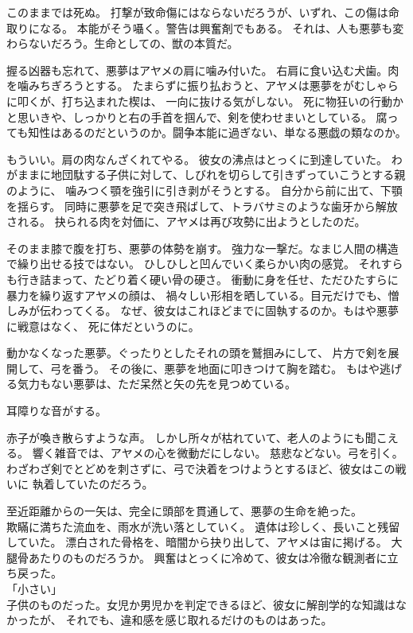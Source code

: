 \documentclass[../IHMain]{subfiles}
\begin{document}
このままでは死ぬ。
打撃が致命傷にはならないだろうが、いずれ、この傷は命取りになる。
本能がそう囁く。警告は興奮剤でもある。
それは、人も悪夢も変わらないだろう。生命としての、獣の本質だ。

握る凶器も忘れて、悪夢はアヤメの肩に噛み付いた。
右肩に食い込む犬歯。肉を噛みちぎろうとする。
たまらずに振り払おうと、アヤメは悪夢をがむしゃらに叩くが、打ち込まれた楔は、
一向に抜ける気がしない。
死に物狂いの行動かと思いきや、しっかりと右の手首を掴んで、剣を使わせまいとしている。
腐っても知性はあるのだというのか。闘争本能に過ぎない、単なる悪戯の類なのか。

もういい。肩の肉なんざくれてやる。
彼女の沸点はとっくに到達していた。
わがままに地団駄する子供に対して、しびれを切らして引きずっていこうとする親のように、
噛みつく顎を強引に引き剥がそうとする。
自分から前に出て、下顎を揺らす。
同時に悪夢を足で突き飛ばして、トラバサミのような歯牙から解放される。
抉られる肉を対価に、アヤメは再び攻勢に出ようとしたのだ。

そのまま膝で腹を打ち、悪夢の体勢を崩す。
強力な一撃だ。なまじ人間の構造で繰り出せる技ではない。
ひしひしと凹んでいく柔らかい肉の感覚。
それすらも行き詰まって、たどり着く硬い骨の硬さ。
衝動に身を任せ、ただひたすらに暴力を繰り返すアヤメの顔は、
禍々しい形相を晒している。目元だけでも、憎しみが伝わってくる。
なぜ、彼女はこれほどまでに固執するのか。もはや悪夢に戦意はなく、
死に体だというのに。

動かなくなった悪夢。ぐったりとしたそれの頭を鷲掴みにして、
片方で剣を展開して、弓を番う。
その後に、悪夢を地面に叩きつけて胸を踏む。
もはや逃げる気力もない悪夢は、ただ呆然と矢の先を見つめている。

耳障りな音がする。

赤子が喚き散らすような声。
しかし所々が枯れていて、老人のようにも聞こえる。
響く雑音では、アヤメの心を微動だにしない。
慈悲などない。弓を引く。
わざわざ剣でとどめを刺さずに、弓で決着をつけようとするほど、彼女はこの戦いに
執着していたのだろう。

至近距離からの一矢は、完全に頭部を貫通して、悪夢の生命を絶った。\\

欺瞞に満ちた流血を、雨水が洗い落としていく。
遺体は珍しく、長いこと残留していた。
漂白された骨格を、暗闇から抉り出して、アヤメは宙に掲げる。
大腿骨あたりのものだろうか。
興奮はとっくに冷めて、彼女は冷徹な観測者に立ち戻った。\\
「小さい」\\
子供のものだった。女児か男児かを判定できるほど、彼女に解剖学的な知識はなかったが、
それでも、違和感を感じ取れるだけのものはあった。
\end{document}
